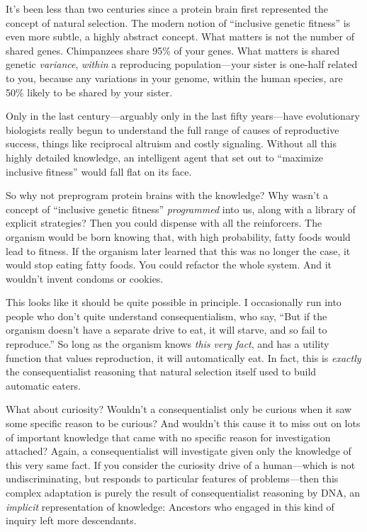 It's been less than two centuries since a protein
brain first represented the concept of natural selection. The modern
notion of ``inclusive genetic
fitness'' is even more subtle, a highly abstract
concept. What matters is not the number of shared genes. Chimpanzees
share 95\% of your genes. What matters is shared genetic
\textit{variance}, \textit{within} a reproducing population---your
sister is one-half related to you, because any variations in your
genome, within the human species, are 50\% likely to be shared by your
sister.


 Only in the last century---arguably only in the last fifty
years---have evolutionary biologists really begun to understand the
full range of causes of reproductive success, things like reciprocal
altruism and costly signaling. Without all this highly detailed
knowledge, an intelligent agent that set out to
``maximize inclusive fitness'' would
fall flat on its face.


 So why not preprogram protein brains with the knowledge? Why
wasn't a concept of ``inclusive
genetic fitness'' \textit{programmed} into us, along
with a library of explicit strategies? Then you could dispense with all
the reinforcers. The organism would be born knowing that, with high
probability, fatty foods would lead to fitness. If the organism later
learned that this was no longer the case, it would stop eating fatty
foods. You could refactor the whole system. And it
wouldn't invent condoms or cookies.


 This looks like it should be quite possible in principle. I
occasionally run into people who don't quite understand
consequentialism, who say, ``But if the organism
doesn't have a separate drive to eat, it will starve,
and so fail to reproduce.'' So long as the organism
knows \textit{this very fact}, and has a utility function that values
reproduction, it will automatically eat. In fact, this is
\textit{exactly} the consequentialist reasoning that natural selection
itself used to build automatic eaters.


 What about curiosity? Wouldn't a consequentialist
only be curious when it saw some specific reason to be curious? And
wouldn't this cause it to miss out on lots of important
knowledge that came with no specific reason for investigation attached?
Again, a consequentialist will investigate given only the knowledge of
this very same fact. If you consider the curiosity drive of a
human---which is not undiscriminating, but responds to particular
features of problems---then this complex adaptation is purely the
result of consequentialist reasoning by DNA, an \textit{implicit}
representation of knowledge: Ancestors who engaged in this kind of
inquiry left more descendants.


